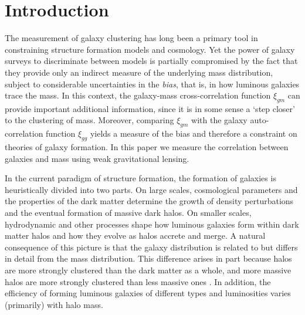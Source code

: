 \documentclass{emulateapj}
\begin{document}


\section{Introduction} \label{intro}



The measurement of galaxy clustering has long been a primary tool in 
constraining structure formation models and cosmology. Yet the power of 
galaxy surveys to discriminate between models is partially  
compromised by the fact that they provide only an indirect
measure of the underlying mass distribution, subject to considerable uncertainties 
in the {\it bias}, that is, in how luminous 
galaxies trace the mass. In this context, the galaxy-mass cross-correlation 
function $\xi_{gm}$ 
can provide important additional information, since it is in some   
sense a `step closer' to the clustering of mass. Moreover, comparing 
$\xi_{gm}$ with the galaxy auto-correlation function $\xi_{gg}$ 
yields a measure of the bias and therefore a constraint on theories 
of galaxy formation. In this paper we 
measure the correlation between galaxies and mass using weak gravitational
lensing.

In the current paradigm of structure formation, the formation of galaxies 
is heuristically divided into two parts. On large scales, cosmological parameters and the properties of the dark matter determine 
the growth of density perturbations and the eventual formation of 
massive dark halos. On smaller scales, hydrodynamic and other processes 
shape how luminous galaxies form within dark matter halos and how they 
evolve as halos accrete and merge. A natural consequence of this picture 
is that the galaxy distribution is related to but differs in detail from the mass 
distribution. This difference arises in part 
because halos are more strongly clustered than the 
dark matter as a whole, and more massive halos are more strongly clustered
than less massive ones \citep{Kaiser84}. In addition, the efficiency of 
forming luminous galaxies of different types and luminosities 
varies (primarily) with halo mass. 
\end{document}
